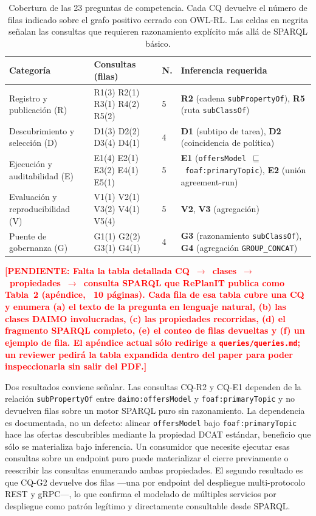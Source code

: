 \documentclass[11pt,a4paper]{article}
\newcommand{\code}[1]{\texttt{#1}}
\newcommand{\TODO}[1]{\textcolor{red}{\textbf{[PENDIENTE: #1]}}}
\begin{document}
\begin{table}[t]
\small\sf\centering
\caption{Cobertura de las 23 preguntas de competencia. Cada CQ devuelve el número de filas indicado sobre el grafo positivo cerrado con OWL-RL. Las celdas en negrita señalan las consultas que requieren razonamiento explícito más allá de SPARQL básico.\label{tab:cqs}}
\begin{tabular}{@{}p{3.3cm}p{2.6cm}p{0.8cm}p{6.3cm}@{}}
\toprule
\textbf{Categoría} & \textbf{Consultas (filas)} & \textbf{N.} & \textbf{Inferencia requerida} \\
\midrule
Registro y publicación (R) & R1(3) R2(1) R3(1) R4(2) R5(2) & 5 & \textbf{R2} (cadena \code{subPropertyOf}), \textbf{R5} (ruta \code{subClassOf}) \\
Descubrimiento y selección (D) & D1(3) D2(2) D3(4) D4(1) & 4 & \textbf{D1} (subtipo de tarea), \textbf{D2} (coincidencia de política) \\
Ejecución y auditabilidad (E) & E1(4) E2(1) E3(2) E4(1) E5(1) & 5 & \textbf{E1} (\code{offersModel}~$\sqsubseteq$~\code{foaf:primaryTopic}), \textbf{E2} (unión agreement-run) \\
Evaluación y reproducibilidad (V) & V1(1) V2(1) V3(2) V4(1) V5(4) & 5 & \textbf{V2}, \textbf{V3} (agregación) \\
Puente de gobernanza (G) & G1(1) G2(2) G3(1) G4(1) & 4 & \textbf{G3} (razonamiento \code{subClassOf}), \textbf{G4} (agregación \code{GROUP\_CONCAT}) \\
\bottomrule
\end{tabular}
\end{table}

\TODO{Falta la tabla detallada CQ~$\to$~clases~$\to$~propiedades~$\to$~consulta SPARQL que RePlanIT publica como Tabla~2 (apéndice, ~10 páginas). Cada fila de esa tabla cubre una CQ y enumera (a) el texto de la pregunta en lenguaje natural, (b) las clases DAIMO involucradas, (c) las propiedades recorridas, (d) el fragmento SPARQL completo, (e) el conteo de filas devueltas y (f) un ejemplo de fila. El apéndice actual sólo redirige a \code{queries/queries.md}; un reviewer pedirá la tabla expandida dentro del paper para poder inspeccionarla sin salir del PDF.}

Dos resultados conviene señalar. Las consultas CQ-R2 y CQ-E1 dependen de la relación \code{subPropertyOf} entre \code{daimo:offersModel} y \code{foaf:primaryTopic} y no devuelven filas sobre un motor SPARQL puro sin razonamiento. La dependencia es documentada, no un defecto: alinear \code{offersModel} bajo \code{foaf:primaryTopic} hace las ofertas descubribles mediante la propiedad DCAT estándar, beneficio que sólo se materializa bajo inferencia. Un consumidor que necesite ejecutar esas consultas sobre un endpoint puro puede materializar el cierre previamente o reescribir las consultas enumerando ambas propiedades. El segundo resultado es que CQ-G2 devuelve dos filas ---una por endpoint del despliegue multi-protocolo REST y gRPC---, lo que confirma el modelado de múltiples servicios por despliegue como patrón legítimo y directamente consultable desde SPARQL.
\end{document}
